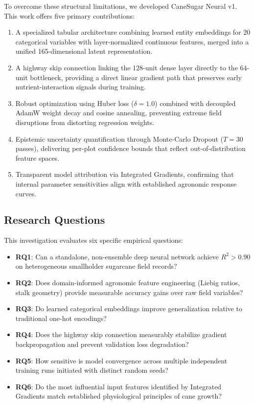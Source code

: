\documentclass[conference,10pt,letterpaper]{IEEEtran}
\begin{document}
To overcome these structural limitations, we developed CaneSugar Neural v1. This work offers five primary contributions:
\begin{enumerate}
    \item A specialized tabular architecture combining learned entity embeddings for 20 categorical variables with layer-normalized continuous features, merged into a unified 165-dimensional latent representation.
    \item A highway skip connection linking the 128-unit dense layer directly to the 64-unit bottleneck, providing a direct linear gradient path that preserves early nutrient-interaction signals during training.
    \item Robust optimization using Huber loss ($\delta = 1.0$) combined with decoupled AdamW weight decay and cosine annealing, preventing extreme field disruptions from distorting regression weights.
    \item Epistemic uncertainty quantification through Monte-Carlo Dropout ($T = 30$ passes), delivering per-plot confidence bounds that reflect out-of-distribution feature spaces.
    \item Transparent model attribution via Integrated Gradients, confirming that internal parameter sensitivities align with established agronomic response curves.
\end{enumerate}

\subsection{Research Questions}
This investigation evaluates six specific empirical questions:
\begin{itemize}
    \item \textbf{RQ1}: Can a standalone, non-ensemble deep neural network achieve $R^2 > 0.90$ on heterogeneous smallholder sugarcane field records?
    \item \textbf{RQ2}: Does domain-informed agronomic feature engineering (Liebig ratios, stalk geometry) provide measurable accuracy gains over raw field variables?
    \item \textbf{RQ3}: Do learned categorical embeddings improve generalization relative to traditional one-hot encodings?
    \item \textbf{RQ4}: Does the highway skip connection measurably stabilize gradient backpropagation and prevent validation loss degradation?
    \item \textbf{RQ5}: How sensitive is model convergence across multiple independent training runs initiated with distinct random seeds?
    \item \textbf{RQ6}: Do the most influential input features identified by Integrated Gradients match established physiological principles of cane growth?
\end{itemize}
\end{document}
